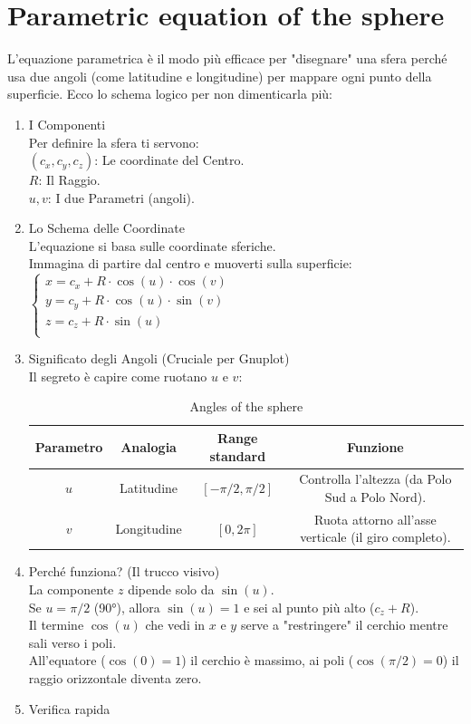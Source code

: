 \documentclass[a4paper,14pt]{article}
\begin{document}
\section{Parametric equation of the sphere}
L'equazione parametrica è il modo più efficace per "disegnare" una sfera perché usa due angoli
(come latitudine e longitudine) per mappare ogni punto della superficie.
Ecco lo schema logico per non dimenticarla più:
\begin{enumerate}
\item I Componenti\\
Per definire la sfera ti servono:\\
\((c_{x},c_{y},c_{z})\): Le coordinate del Centro.\\
\(R\): Il Raggio.\\
\(u,v\): I due Parametri (angoli).\\
\item Lo Schema delle Coordinate\\
L'equazione si basa sulle coordinate sferiche.\\
Immagina di partire dal centro e muoverti sulla superficie:\\
\(
\begin{cases}
x=c_{x}+R\cdot \cos (u)\cdot \cos (v)\\
y=c_{y}+R\cdot \cos (u)\cdot \sin (v)\\
z=c_{z}+R\cdot \sin (u)\\
\end{cases}
\)
\item Significato degli Angoli (Cruciale per Gnuplot)\\
Il segreto è capire come ruotano \(u\) e \(v\):
\begin{table}[h!]
\begin{center}
\begin{tabular}{|c|c|c|c|}
\hline
\textbf{Parametro} & \textbf{Analogia} & \textbf{Range standard} & \textbf{Funzione} \\
\hline
\(u\) & Latitudine & \([-\pi /2,\pi /2]\)& Controlla l'altezza (da Polo Sud a Polo Nord).\\
\hline
\(v\) & Longitudine & \([0,2\pi ]\)& Ruota attorno all'asse verticale (il giro completo).\\
\hline
\end{tabular}
\caption{Angles of the sphere}
\end{center}
\end{table}
\item Perché funziona? (Il trucco visivo) \\
La componente \(z\) dipende solo da \(\sin (u)\). \\
Se \( u=\pi /2 \) (90°), allora \(\sin (u)=1\) e sei al punto più alto (\(c_{z}+R\)). \\
Il termine \(\cos (u)\) che vedi in \(x\) e \(y\) serve a "restringere" il cerchio mentre sali verso i poli.\\
All'equatore (\(\cos (0)=1\)) il cerchio è massimo, ai poli (\(\cos (\pi /2)=0\)) il raggio orizzontale diventa zero.\\
\item Verifica rapida

\end{enumerate}
\end{document}
